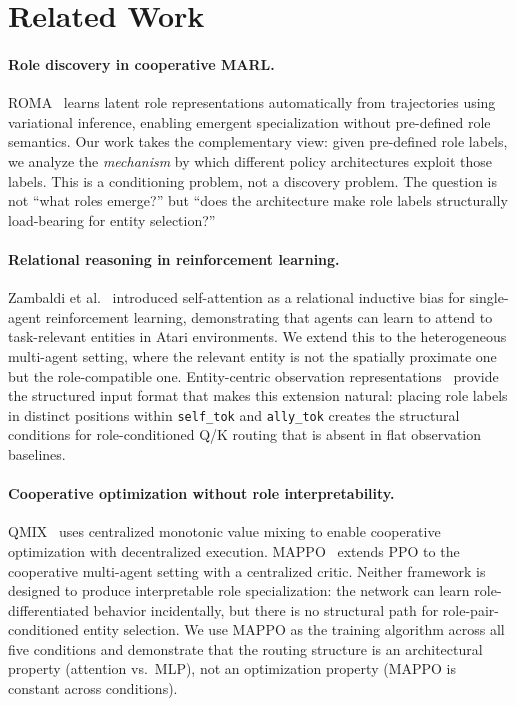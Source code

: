 \section{Related Work}
\label{sec:related}

\paragraph{Role discovery in cooperative MARL.}
ROMA~\cite{roma2020} learns latent role representations automatically from trajectories using variational inference, enabling emergent specialization without pre-defined role semantics. Our work takes the complementary view: given pre-defined role labels, we analyze the \emph{mechanism} by which different policy architectures exploit those labels. This is a conditioning problem, not a discovery problem. The question is not ``what roles emerge?'' but ``does the architecture make role labels structurally load-bearing for entity selection?''

\paragraph{Relational reasoning in reinforcement learning.}
Zambaldi et al.~\cite{zambaldi2018} introduced self-attention as a relational inductive bias for single-agent reinforcement learning, demonstrating that agents can learn to attend to task-relevant entities in Atari environments. We extend this to the heterogeneous multi-agent setting, where the relevant entity is not the spatially proximate one but the role-compatible one. Entity-centric observation representations~\cite{entitycentric} provide the structured input format that makes this extension natural: placing role labels in distinct positions within \texttt{self\_tok} and \texttt{ally\_tok} creates the structural conditions for role-conditioned Q/K routing that is absent in flat observation baselines.

\paragraph{Cooperative optimization without role interpretability.}
QMIX~\cite{qmix} uses centralized monotonic value mixing to enable cooperative optimization with decentralized execution. MAPPO~\cite{mappo} extends PPO to the cooperative multi-agent setting with a centralized critic. Neither framework is designed to produce interpretable role specialization: the network can learn role-differentiated behavior incidentally, but there is no structural path for role-pair-conditioned entity selection. We use MAPPO as the training algorithm across all five conditions and demonstrate that the routing structure is an architectural property (attention vs.\ MLP), not an optimization property (MAPPO is constant across conditions).


